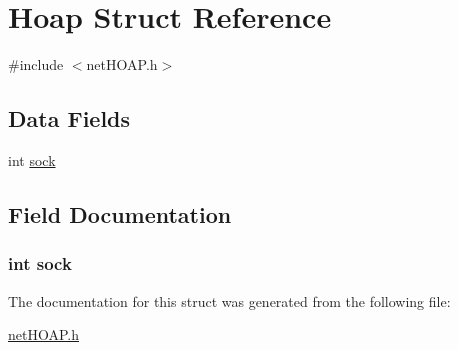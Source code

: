 \hypertarget{struct_hoap}{\section{Hoap Struct Reference}
\label{struct_hoap}
}


{\ttfamily \#include $<$net\-H\-O\-A\-P.\-h$>$}

\subsection*{Data Fields}
\begin{DoxyCompactItemize}
\item 
int \hyperlink{struct_hoap_a5903d0b282fc5eae503de618f896b5e1}{sock}
\end{DoxyCompactItemize}


\subsection{Field Documentation}
\hypertarget{struct_hoap_a5903d0b282fc5eae503de618f896b5e1}{
\subsubsection[{sock}]{\setlength{\rightskip}{0pt plus 5cm}int sock}}\label{struct_hoap_a5903d0b282fc5eae503de618f896b5e1}


The documentation for this struct was generated from the following file\-:\begin{DoxyCompactItemize}
\item 
\hyperlink{net_h_o_a_p_8h}{net\-H\-O\-A\-P.\-h}\end{DoxyCompactItemize}

